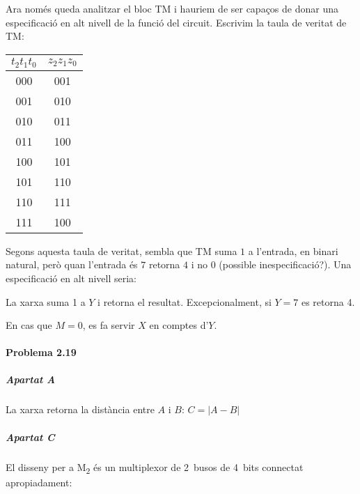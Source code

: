 Ara només queda analitzar el bloc \textsf{TM} i hauriem de ser capaços de donar una especificació en alt nivell de la funció del circuit. Escrivim la taula de veritat de \textsf{TM}:

\begin{center} \begin{tabular}{cc}
$t_2t_1t_0$ & $z_2z_1z_0$ \\
\hline
000 & 001 \\
001 & 010 \\
010 & 011 \\
011 & 100 \\
100 & 101 \\
101 & 110 \\
110 & 111 \\
111 & 100
\end{tabular} \end{center}

Segons aquesta taula de veritat, sembla que \textsf{TM} suma $1$ a l'entrada, en binari natural, però quan l'entrada és $7$ retorna $4$ i no $0$ (possible inespecificació?). Una especificació en alt nivell seria:

\begin{displayquote}
La xarxa suma 1 a $Y$ i retorna el resultat. Excepcionalment, si $Y=7$ es retorna 4.

En cas que $M=0$, es fa servir $X$ en comptes d'$Y$.
\end{displayquote}

\finishpage


\page
\paragraph{Problema 2.19} \hspace{0em}

\subparagraph{Apartat A}

La xarxa retorna la distància entre $A$ i $B$: $C = \left|A - B\right|$

\subparagraph{Apartat C} El disseny per a \textsf{M\textsubscript{2}} és un multiplexor de 2~busos de 4~bits connectat apropiadament:

\vspace{1.5em} %
\begin{center}  \end{center}

